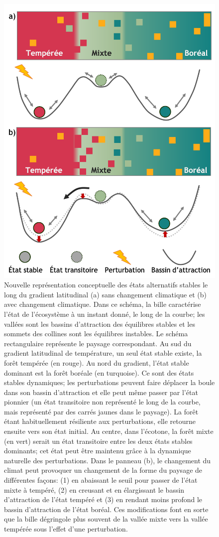 \begin{figure}
\centering
\includegraphics[width=.63\textwidth]{conclusion/figures/etat_alternatif2.png}
\caption[États alternatifs stables le long du gradient latitudinal]{Nouvelle représentation conceptuelle des états alternatifs stables le long du gradient latitudinal (a) sans changement climatique et (b) avec changement climatique. Dans ce schéma, la bille caractérise l'état de l'écosystème à un instant donné, le long de la courbe; les vallées sont les bassins d'attraction des équilibres stables et les sommets des collines sont les équilibres instables. Le schéma rectangulaire représente le paysage correspondant. Au sud du gradient latitudinal de température, un seul état stable existe, la forêt tempérée (en rouge). Au nord du gradient, l'état stable dominant est la forêt boréale (en turquoise). Ce sont des états stables dynamiques; les perturbations peuvent faire déplacer la boule dans son bassin d'attraction et elle peut même passer par l'état pionnier (un état transitoire non représenté le long de la courbe, mais représenté par des carrés jaunes dans le paysage). La forêt étant habituellement résiliente aux perturbations, elle retourne ensuite vers son état initial. Au centre, dans l'écotone, la forêt mixte (en vert) serait un état transitoire entre les deux états stables dominants; cet état peut être maintenu grâce à la dynamique naturelle des perturbations. Dans le panneau (b), le changement du climat peut provoquer un changement de la forme du paysage de différentes façons: (1) en abaissant le seuil pour passer de l'état mixte à tempéré, (2) en creusant et en élargissant le bassin d'attraction de l'état tempéré et (3) en rendant moins profond le bassin d'attraction de l'état boréal. Ces modifications font en sorte que la bille dégringole plus souvent de la vallée mixte vers la vallée tempérée sous l'effet d'une perturbation.}
\label{fig4.1}
\end{figure}

